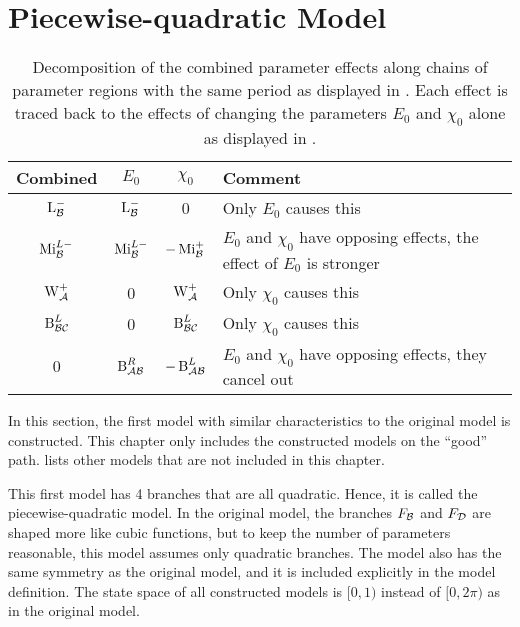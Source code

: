 \section{Piecewise-quadratic Model}
\label{sec:setup.quad}

\begin{table}
	\centering
	\begin{tabular}{|c|c|c|l|} \hline
		Combined         & $E_0$            & $\chi_0$          & Comment                   \\ \hline \hline
		$\operatorname{L}_{\mathcal{B}}^{-}$   & $\operatorname{L}_{\mathcal{B}}^{-}$   & 0                 & Only $E_0$ causes this    \\ \hline
		$\operatorname{Mi}_{\mathcal{B}}^{L-}$ & $\operatorname{Mi}_{\mathcal{B}}^{L-}$ & $-\operatorname{Mi}_{\mathcal{B}}^{+}$  &
		$E_0$ and $\chi_0$ have opposing effects, the effect of $E_0$ is stronger           \\ \hline
		$\operatorname{W}_{\mathcal{A}}^{+}$   & 0                & $\operatorname{W}_{\mathcal{A}}^{+}$    & Only $\chi_0$ causes this \\ \hline \hline
		$\operatorname{B}_{\mathcal{B}\mathcal{C}}^{L}$ & 0                & $\operatorname{B}_{\mathcal{B}\mathcal{C}}^{L}$  & Only $\chi_0$ causes this \\ \hline
		0                & $\operatorname{B}_{\mathcal{A}\mathcal{B}}^{R}$ & $-\operatorname{B}_{\mathcal{A}\mathcal{B}}^{L}$ &
		$E_0$ and $\chi_0$ have opposing effects, they cancel out                           \\ \hline
	\end{tabular}
	\caption[Decomposition table of combined parameter effects]{
		Decomposition of the combined parameter effects along chains of parameter regions with the same period as displayed in .
		Each effect is traced back to the effects of changing the parameters $E_0$ and $\chi_0$ alone as displayed in  .
	}
	\label{table:setup.char.paramfx}
\end{table}

In this section, the first model with similar characteristics to the original model is constructed.
This chapter only includes the constructed models on the ``good'' path.
 lists other models that are not included in this chapter.

This first model has 4 branches that are all quadratic.
Hence, it is called the piecewise-quadratic model.
In the original model, the branches $F_{\mathcal{B}}$ and $F_{\mathcal{D}}$ are shaped more like cubic functions, but to keep the number of parameters reasonable, this model assumes only quadratic branches.
The model also has the same symmetry as the original model, and it is included explicitly in the model definition.
The state space of all constructed models is $[0, 1)$ instead of $[0, 2\pi)$ as in the original model.




